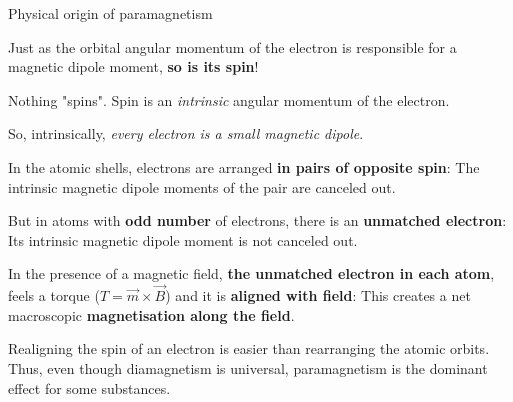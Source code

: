 \begin{frame}{Physical origin of paramagnetism}

Just as the orbital angular momentum of the electron
is responsible for a magnetic dipole moment, {\bf so is its spin}!
\begin{itemize}
{\small
  \item Nothing "spins". Spin is an {\em intrinsic} angular momentum of the electron.
  \item So, intrinsically, {\em every electron is a small magnetic dipole}.
}
\end{itemize}

\vspace{0.1cm}

In the atomic shells, electrons are arranged {\bf in pairs of opposite spin}:
The intrinsic magnetic dipole moments of the pair are canceled out.\\
\vspace{0.2cm}

But in atoms with {\bf odd number} of electrons, there is an {\bf unmatched electron}:
Its intrinsic magnetic dipole moment is not canceled out.\\
\vspace{0.2cm}

In the presence of a magnetic field, {\bf the unmatched electron in each atom}, feels a
torque ($T = \vec{m} \times \vec{B}$) and it is {\bf aligned with field}:
This creates a  net macroscopic {\bf magnetisation along the field}.\\
\vspace{0.2cm}

Realigning the spin of an electron is easier than rearranging the atomic orbits.
Thus, even though diamagnetism is universal, paramagnetism is the dominant effect for some substances.

\end{frame}

%
%
%

